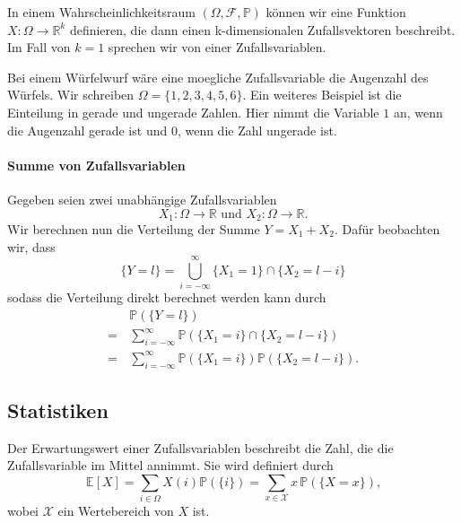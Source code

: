 \begin{Def}
In einem Wahrscheinlichkeitsraum $(\Omega, \mathcal{F}, \mathbb{P})$ k\"onnen wir eine Funktion $X:\Omega \rightarrow \mathbb{R}^k$  definieren, die dann einen k-dimensionalen Zufallsvektoren beschreibt. Im Fall von $k=1$ sprechen wir von einer Zufallsvariablen.
\end{Def}

Bei einem W\"urfelwurf w\"are eine moegliche Zufallsvariable die Augenzahl des W\"urfels. Wir schreiben $\Omega =  \{1,2,3,4,5,6\}$. 
Ein weiteres Beispiel ist die Einteilung in \glqq gerade\grqq{} und \glqq ungerade\grqq{} Zahlen. Hier nimmt die Variable $1$ an, wenn die Augenzahl gerade ist und $0$, wenn die Zahl ungerade ist.

\vspace{10pt}

\paragraph {Summe von Zufallsvariablen}
Gegeben seien zwei unabhängige Zufallsvariablen
\begin{equation*}
X_{1}:\Omega \rightarrow \mathbb{R} \text{ und }  X_{2}:\Omega \rightarrow \mathbb{R}.
\end{equation*}
Wir berechnen nun die Verteilung der Summe $Y=X_{1}+X_{2}$. Daf\"ur beobachten wir,  dass
\begin{equation*}
\{Y=l\}=\bigcup_{i=-\infty}^{\infty} \{X_{1}=1\} \cap \{X_{2}=l-i\}
\end{equation*}
sodass die Verteilung direkt berechnet werden kann durch
\begin{align}
\label{eq:zvsumme}
&\mathbb{P} (\{Y=l\}) \\
=\, &\sum_{i=-\infty}^{\infty} \mathbb{P} (\{X_{1}=i\} \cap \{X_{2}=l-i\})\nonumber\\
=\, &\sum_{i=-\infty}^{\infty} \mathbb{P} (\{X_{1} = i\})  \mathbb{P} (\{X_{2}=l-i\}) \nonumber. 
\end{align}


\subsection{Statistiken}

\begin{Def}[Erwartungswert]
 Der Erwartungswert einer Zufallsvariablen beschreibt die Zahl, die die Zufallsvariable im Mittel annimmt. Sie wird definiert durch
\begin{equation*}
\mathbb{E} [X] = \sum_{i \in \Omega} X (i) \mathbb{P} (\{i\}) = \sum_{x\in\mathcal{X}} x \, \mathbb{P} (\{X=x\}) \text{,}
\end{equation*}
wobei $\mathcal{X}$ ein Wertebereich von $X$ ist.
\end{Def}

